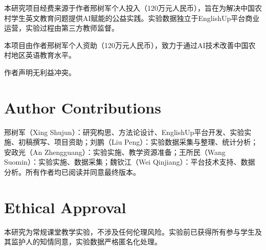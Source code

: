 \documentclass[Afour,sageapa,times]{sagej}
\begin{document}
\begin{acks}
本研究项目经费来源于作者邢树军个人投入（120万元人民币），旨在为解决中国农村学生英文教育问题提供AI赋能的公益实践。实验数据独立于EnglishUp平台商业运营，实验过程由第三方教师监督。
\end{acks}

\begin{funding}
本项目由作者邢树军个人资助（120万元人民币），致力于通过AI技术改善中国农村地区英语教育水平。
\end{funding}

\begin{dci}
作者声明无利益冲突。
\end{dci}

\section*{Author Contributions}
邢树军（Xing Shujun）：研究构思、方法论设计、EnglishUp平台开发、实验实施、初稿撰写、项目资助；刘鹏（Liu Peng）：实验数据采集与整理、统计分析；安政光（An Zhengguang）：实验实施、教学资源准备；王所民（Wang Suomin）：实验实施、数据采集；魏钦江（Wei Qinjiang）：平台技术支持、数据分析。所有作者均已阅读并同意最终版本。

\section*{Ethical Approval}
本研究为常规课堂教学实验，不涉及任何伦理风险。实验前已获得所有参与学生及其监护人的知情同意，实验数据严格匿名化处理。
\end{document}
